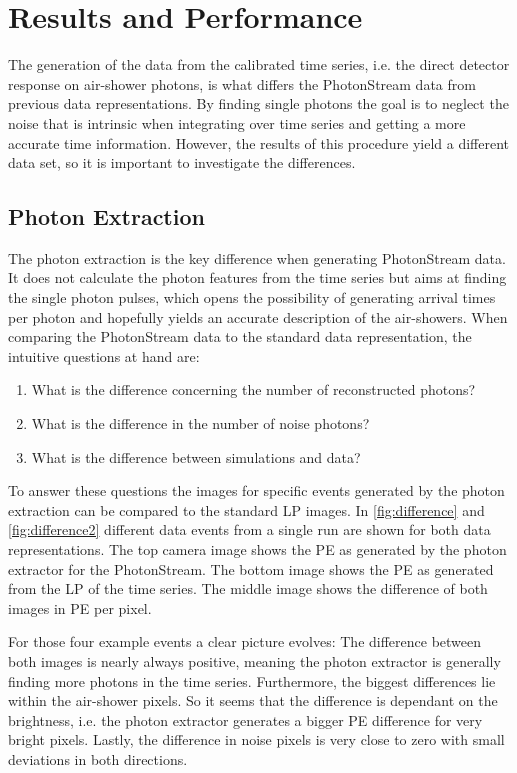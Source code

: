 \chapter{Results and Performance}
\label{ch:results}
%
The generation of the data from the calibrated time series, i.e. the direct
detector response on air-shower photons, is what differs the PhotonStream data
from previous data representations. By finding single photons the goal is to
neglect the noise that is intrinsic when integrating over time series and
getting a more accurate time information. However, the results of this procedure
yield a different data set, so it is important to investigate the differences.

\section{Photon Extraction}
\label{sec:ph_ex}%
%
The photon extraction is the key difference when generating PhotonStream data.
It does not calculate the photon features from the time series but aims at
finding the single photon pulses, which opens the possibility of generating
arrival times per photon and hopefully yields an accurate description of the
air-showers. When comparing the PhotonStream data to the standard data
representation, the intuitive questions at hand are:
%
\begin{enumerate}
  \item What is the difference concerning the number of reconstructed photons?
  \item What is the difference in the number of noise photons?
  \item What is the difference between simulations and data?
\end{enumerate}
%
To answer these questions the images for specific events generated by the
photon extraction can be compared to the standard LP images. In
\autoref{fig:difference} and \autoref{fig:difference2} different data events
from a single run are shown for both data representations. The top camera image
shows the PE as generated by the photon extractor for the PhotonStream. The
bottom image shows the PE as generated from the LP of the time series. The
middle image shows the difference of both images in PE per pixel.

For those four example events a clear picture evolves: The difference between
both images is nearly always positive, meaning the photon extractor is
generally finding more photons in the time series. Furthermore, the biggest
differences lie within the air-shower pixels. So it seems that the difference
is dependant on the brightness, i.e. the photon extractor generates a bigger
PE difference for very bright pixels. Lastly, the difference in noise pixels is
very close to zero with small deviations in both directions.

